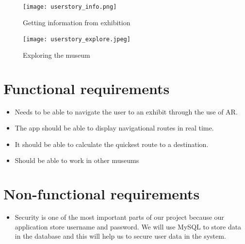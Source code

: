 \begin{figure}[H]
    \texttt{[image: userstory\_info.png]}
    \caption{Getting information from exhibition}
    \label{fig:infofromexhibit}
\end{figure}

\begin{figure}[H]
    \texttt{[image: userstory\_explore.jpeg]}
    \caption{Exploring the museum}
    \label{fig:exploring}
\end{figure}

\section{Functional requirements}
\begin{itemize}
        \item Needs to be able to navigate the user to an exhibit through the use of AR.
        \item The app should be able to display navigational routes in real time.
        \item It should be able to calculate the quickest route to a destination.
        \item Should be able to work in other museums
\end{itemize}

\section{Non-functional requirements}
\begin{itemize}
        \item Security is one of the most important parts of our project because our application store username and password. We will use MySQL to store data in the database and this will help us to secure user data in the system.
\end{itemize}
    